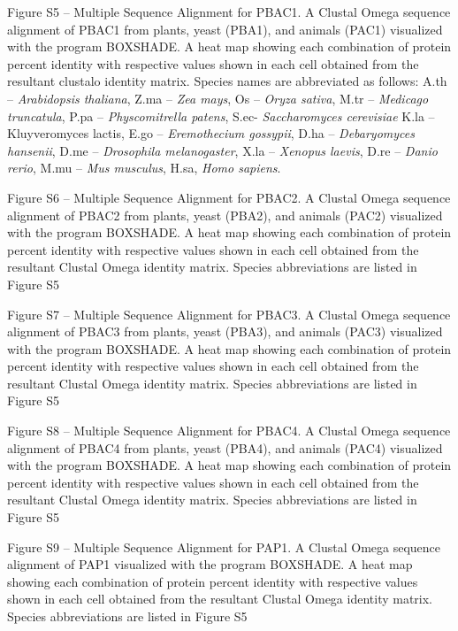 Figure S5 – Multiple Sequence Alignment for PBAC1. A Clustal Omega \citep{sievers14} sequence alignment of PBAC1 from plants, yeast (PBA1), and animals (PAC1) visualized with the program BOXSHADE. A heat map showing each combination of protein percent identity with respective values shown in each cell obtained from the resultant clustalo identity matrix. Species names are abbreviated as follows: A.th – \textit{Arabidopsis thaliana}, Z.ma – \textit{Zea mays}, Os – \textit{Oryza sativa}, M.tr – \textit{Medicago truncatula}, P.pa – \textit{Physcomitrella patens}, S.ec- \textit{Saccharomyces cerevisiae} K.la – {Kluyveromyces lactis}, E.go – \textit{Eremothecium gossypii}, D.ha – \textit{Debaryomyces hansenii}, D.me – \textit{Drosophila melanogaster}, X.la – \textit{Xenopus laevis}, D.re – \textit{Danio rerio}, M.mu – \textit{Mus musculus}, H.sa, \textit{Homo sapiens}.


Figure S6 – Multiple Sequence Alignment for PBAC2. A Clustal Omega \citep{sievers14} sequence alignment of PBAC2 from plants, yeast (PBA2), and animals (PAC2) visualized with the program BOXSHADE. A heat map showing each combination of protein percent identity with respective values shown in each cell obtained from the resultant Clustal Omega identity matrix. Species abbreviations are listed in Figure S5

Figure S7 – Multiple Sequence Alignment for PBAC3. A Clustal Omega \citep{sievers14} sequence alignment of PBAC3 from plants, yeast (PBA3), and animals (PAC3) visualized with the program BOXSHADE. A heat map showing each combination of protein percent identity with respective values shown in each cell obtained from the resultant Clustal Omega identity matrix. Species abbreviations are listed in Figure S5

Figure S8 – Multiple Sequence Alignment for PBAC4. A Clustal Omega \citep{sievers14} sequence alignment of PBAC4 from plants, yeast (PBA4), and animals (PAC4) visualized with the program BOXSHADE. A heat map showing each combination of protein percent identity with respective values shown in each cell obtained from the resultant Clustal Omega identity matrix. Species abbreviations are listed in Figure S5

Figure S9 – Multiple Sequence Alignment for PAP1. A Clustal Omega \citep{sievers14} sequence alignment of PAP1 visualized with the program BOXSHADE. A heat map showing each combination of protein percent identity with respective values shown in each cell obtained from the resultant Clustal Omega identity matrix. Species abbreviations are listed in Figure S5

